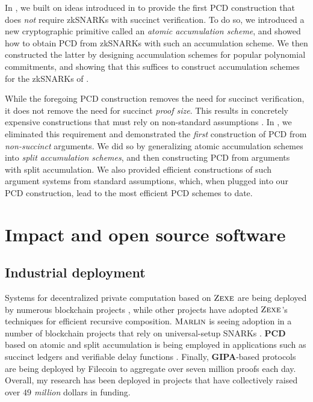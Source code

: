\documentclass[11pt,letterpaper]{article}
\theoremstyle{definition} %
\theoremstyle{remark} %
\newcommand{\zexe}{\textsc{Zexe}}
\newcommand{\marlin}{\textsc{Marlin}}
\begin{document}
In \cite{BunzCMS20}, we built on ideas introduced in \cite{BoweGH19} to provide the first PCD construction that does \emph{not} require zkSNARKs with succinct verification. To do so, we introduced a new cryptographic primitive called an \emph{atomic accumulation scheme}, and showed how to obtain PCD from zkSNARKs with such an accumulation scheme. We then constructed the latter by designing accumulation schemes for popular polynomial commitments, and showing that this suffices to construct accumulation schemes for the zkSNARKs of \cite{ChiesaHMMVW20}.

While the foregoing PCD construction removes the need for succinct verification, it does not remove the need for succinct \emph{proof size}. This results in concretely expensive constructions that must rely on non-standard assumptions \cite{GentryW11}. In \cite{BunzCLMS21}, we eliminated this requirement and demonstrated the \emph{first} construction of PCD from \emph{non-succinct} arguments. We did so by generalizing atomic accumulation schemes into \emph{split accumulation schemes}, and then constructing PCD from arguments with split accumulation. We also provided efficient constructions of such argument systems from standard assumptions, which, when plugged into our PCD construction, lead to the most efficient PCD schemes to date.


\section{Impact and open source software}
\label{sec:impact}

\subsection{Industrial deployment}
\label{sec:deployment}

Systems for decentralized private computation based on \textbf{$\zexe$} are being deployed by numerous blockchain projects  \cite{aleo, mir, aztec, anoma}, while other projects \cite{celo, penumbra} have adopted $\zexe$'s techniques for efficient recursive composition.
\textbf{$\marlin$} is seeing adoption in a number of blockchain projects that rely on universal-setup SNARKs \cite{aleo,horizen, HabockGD21}.
\textbf{PCD} based on atomic and split accumulation is being employed in applications such as succinct ledgers \cite{BonneauMRS20,mina-general} and verifiable delay functions \cite{BonehBBF18, filecoin-vdf}.
Finally, \textbf{GIPA}-based protocols are being deployed by Filecoin \cite{GaillyMN21} to aggregate over seven million proofs each day.
Overall, my research has been deployed in projects that have collectively raised over \emph{$49$ million} dollars in funding.
  
\end{document}
